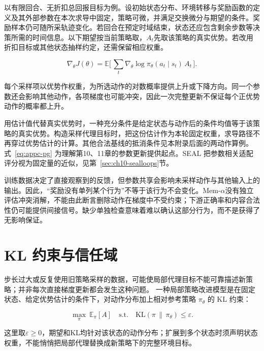 以有限回合、无折扣总回报目标为例。设初始状态分布、环境转移与奖励函数的定义及其外部参数在本次求导中固定，策略可微，并满足交换微分与期望的条件。奖励样本仍可随所采轨迹变化。若回合在预定时域结束，状态还应包含剩余步数等决策所需的时间信息。以下期望按当前策略取，$A_t$先取该策略的真实优势。若改用折扣目标或其他状态抽样约定，还需保留相应权重。

\begin{equation}
\nabla_\theta J(\theta)=\mathbb E\Big[\,\sum_t \nabla_\theta \log \pi_\theta(a_t\mid s_t)\,A_t\,\Big].
\label{eq:appc-pg}
\end{equation}

每个采样项以优势作权重，为所选动作的对数概率提供上升或下降方向。同一个参数还会影响其他动作，各项梯度也可能冲突，因此一次完整更新不保证每个正优势动作的概率都上升。

用估计值代替真实优势时，一种充分条件是给定状态与动作后的条件均值等于该策略的真实优势。构造采样代理目标时，把这份估计作为本轮固定权重，求导路径不再穿过优势估计的计算。其他合法基线的抵消条件见本附录后面的两动作算例。
式~\eqref{eq:appc-pg} 为理解第10、11章的参数更新提供起点。SEAL 把参数相关适配评分视为固定量的近似，见第~\ref{sec:ch10-sealloops}节。

\begin{principlebox}
训练数据决定了直接观察到的反馈，但参数共享会影响未采样动作与其他输入上的输出。因此，“奖励没有单列某个行为”不等于该行为不会变化。Mem-$\alpha$没有独立评估冲突消解，不能由此断言删除动作在梯度中不受约束；下游正确率和内容合法性仍可能提供间接信号\cite{memalpha-2509}。缺少单独检查意味着难以确认这部分行为，而不是获得了无影响保证。
\end{principlebox}

\section{KL 约束与信任域}
\label{sec:appc-kl}

步长过大或反复使用旧策略采样的数据，可能使局部代理目标不能可靠描述新策略；并非每次直接梯度更新都会发生这种问题。
一种局部策略改进模型是在固定状态、给定优势估计的条件下，对动作分布加上相对参考策略 $\pi_{\theta}$ 的 KL 约束：

\begin{equation}
\max_{\pi}\ \mathbb E_{\pi}[A]\quad \text{s.t.}\quad \mathrm{KL}(\pi\,\|\,\pi_{\theta})\le \varepsilon .
\label{eq:appc-kl}
\end{equation}

这里取$\varepsilon\ge0$，期望和KL均针对该状态的动作分布；扩展到多个状态时须声明状态权重，不能悄悄把局部代理替换成新策略下的完整环境目标。

